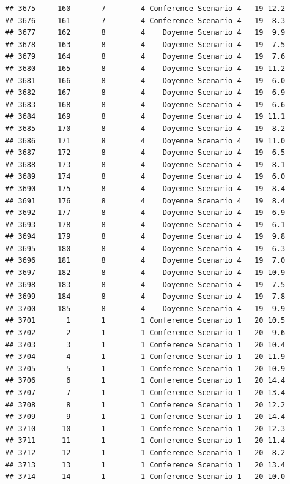 \documentclass[
]{article}
\begin{document}
\begin{verbatim}
## 3675     160       7        4 Conference Scenario 4   19 12.2
## 3676     161       7        4 Conference Scenario 4   19  8.3
## 3677     162       8        4    Doyenne Scenario 4   19  9.9
## 3678     163       8        4    Doyenne Scenario 4   19  7.5
## 3679     164       8        4    Doyenne Scenario 4   19  7.6
## 3680     165       8        4    Doyenne Scenario 4   19 11.2
## 3681     166       8        4    Doyenne Scenario 4   19  6.0
## 3682     167       8        4    Doyenne Scenario 4   19  6.9
## 3683     168       8        4    Doyenne Scenario 4   19  6.6
## 3684     169       8        4    Doyenne Scenario 4   19 11.1
## 3685     170       8        4    Doyenne Scenario 4   19  8.2
## 3686     171       8        4    Doyenne Scenario 4   19 11.0
## 3687     172       8        4    Doyenne Scenario 4   19  6.5
## 3688     173       8        4    Doyenne Scenario 4   19  8.1
## 3689     174       8        4    Doyenne Scenario 4   19  6.0
## 3690     175       8        4    Doyenne Scenario 4   19  8.4
## 3691     176       8        4    Doyenne Scenario 4   19  8.4
## 3692     177       8        4    Doyenne Scenario 4   19  6.9
## 3693     178       8        4    Doyenne Scenario 4   19  6.1
## 3694     179       8        4    Doyenne Scenario 4   19  9.8
## 3695     180       8        4    Doyenne Scenario 4   19  6.3
## 3696     181       8        4    Doyenne Scenario 4   19  7.0
## 3697     182       8        4    Doyenne Scenario 4   19 10.9
## 3698     183       8        4    Doyenne Scenario 4   19  7.5
## 3699     184       8        4    Doyenne Scenario 4   19  7.8
## 3700     185       8        4    Doyenne Scenario 4   19  9.9
## 3701       1       1        1 Conference Scenario 1   20 10.5
## 3702       2       1        1 Conference Scenario 1   20  9.6
## 3703       3       1        1 Conference Scenario 1   20 10.4
## 3704       4       1        1 Conference Scenario 1   20 11.9
## 3705       5       1        1 Conference Scenario 1   20 10.9
## 3706       6       1        1 Conference Scenario 1   20 14.4
## 3707       7       1        1 Conference Scenario 1   20 13.4
## 3708       8       1        1 Conference Scenario 1   20 12.2
## 3709       9       1        1 Conference Scenario 1   20 14.4
## 3710      10       1        1 Conference Scenario 1   20 12.3
## 3711      11       1        1 Conference Scenario 1   20 11.4
## 3712      12       1        1 Conference Scenario 1   20  8.2
## 3713      13       1        1 Conference Scenario 1   20 13.4
## 3714      14       1        1 Conference Scenario 1   20 10.0

\end{verbatim}
\end{document}

